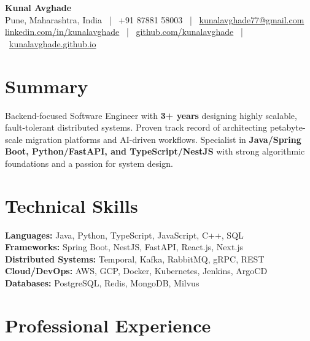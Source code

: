 \documentclass[10pt,a4paper]{article}
\begin{document}
\begin{center}
    {\huge \textbf{Kunal Avghade}} \\
    \small
    Pune, Maharashtra, India \ | \ +91 87881 58003 \ | \ \href{mailto:kunalavghade77@gmail.com}{kunalavghade77@gmail.com} \\
    \href{https://linkedin.com/in/kunalavghade}{linkedin.com/in/kunalavghade} \ | \
    \href{https://github.com/kunalavghade}{github.com/kunalavghade} \ | \
    \href{https://kunalavghade.github.io}{kunalavghade.github.io}
\end{center}

\section{Summary}
Backend-focused Software Engineer with \textbf{3+ years} designing highly scalable, fault-tolerant distributed systems. Proven track record of architecting petabyte-scale migration platforms and AI-driven workflows. Specialist in \textbf{Java/Spring Boot, Python/FastAPI, and TypeScript/NestJS} with strong algorithmic foundations and a passion for system design.
\section{Technical Skills}
\textbf{Languages:} Java, Python, TypeScript, JavaScript, C++, SQL \\
\textbf{Frameworks:} Spring Boot, NestJS, FastAPI, React.js, Next.js \\
\textbf{Distributed Systems:} Temporal, Kafka, RabbitMQ, gRPC, REST \\
\textbf{Cloud/DevOps:} AWS, GCP, Docker, Kubernetes, Jenkins, ArgoCD \\
\textbf{Databases:} PostgreSQL, Redis, MongoDB, Milvus

\section{Professional Experience}
\end{document}
